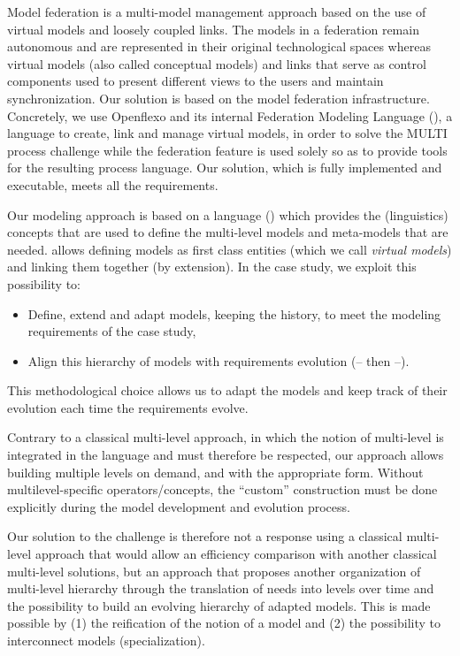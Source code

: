 Model federation is a multi-model management approach based on the use of
virtual models and loosely coupled links. The models in a federation remain
autonomous and are represented in their original technological spaces whereas
virtual models (also called conceptual models) and links that serve as control
components used to present different views to the users and maintain
synchronization. Our solution is based on the model federation infrastructure.
Concretely, we use Openflexo and its internal Federation Modeling Language
(\FML), a language to create, link and manage virtual models, in order to solve
the MULTI process challenge while the federation feature is used solely so as
to provide tools for the resulting process language. Our solution, which is
fully implemented and executable, meets all the requirements.

Our modeling approach is based on a language (\FML) which provides the
(linguistics) concepts that are used to define the multi-level models and
meta-models that are needed. \FML allows defining models as first class
entities (which we call \emph{virtual models}) and linking them together (by
extension). In the \mpc case study, we exploit this possibility to:
\begin{itemize}
    \item Define, extend and adapt models, keeping the history, to meet the %
    modeling requirements of the case study,
    \item Align this hierarchy of models with requirements evolution
      (-- then --).
\end{itemize}
This methodological choice allows us to adapt the models and keep track of their evolution each time the requirements evolve.

Contrary to a classical multi-level approach, in which the notion of
multi-level is integrated in the language and must therefore be respected, our
approach allows building multiple levels on demand, and with the appropriate form.
Without multilevel-specific operators/concepts, the \enquote{custom}
construction must be done explicitly during the model development and evolution
process.

Our solution to the challenge is therefore not a response using a classical multi-level approach that would allow an efficiency comparison with another classical multi-level solutions, but an approach that proposes another organization of multi-level hierarchy through the translation of needs into levels over time and the possibility to build an evolving hierarchy of adapted models. This is made possible by (1) the reification of the notion of a model and (2) the possibility to interconnect models (specialization).%


